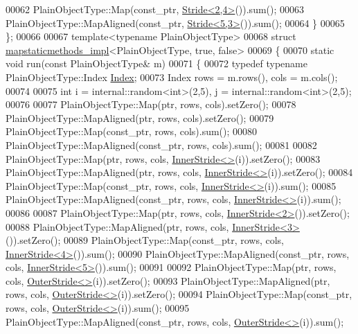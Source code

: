 \begin{DoxyCode}
00062     PlainObjectType::Map(const\_ptr, \hyperlink{group___core___module_class_eigen_1_1_stride}{Stride<2,4>}()).sum();
00063     PlainObjectType::MapAligned(const\_ptr, \hyperlink{group___core___module_class_eigen_1_1_stride}{Stride<5,3>}()).sum();
00064   \}
00065 \};
00066 
00067 \textcolor{keyword}{template}<\textcolor{keyword}{typename} PlainObjectType>
00068 \textcolor{keyword}{struct }\hyperlink{structmapstaticmethods__impl}{mapstaticmethods\_impl}<PlainObjectType, true, false>
00069 \{
00070   \textcolor{keyword}{static} \textcolor{keywordtype}{void} run(\textcolor{keyword}{const} PlainObjectType& m)
00071   \{
00072     \textcolor{keyword}{typedef} \textcolor{keyword}{typename} PlainObjectType::Index \hyperlink{namespace_eigen_a62e77e0933482dafde8fe197d9a2cfde}{Index};
00073     Index rows = m.rows(), cols = m.cols();
00074 
00075     \textcolor{keywordtype}{int} i = internal::random<int>(2,5), j = internal::random<int>(2,5);
00076 
00077     PlainObjectType::Map(ptr, rows, cols).setZero();
00078     PlainObjectType::MapAligned(ptr, rows, cols).setZero();
00079     PlainObjectType::Map(const\_ptr, rows, cols).sum();
00080     PlainObjectType::MapAligned(const\_ptr, rows, cols).sum();
00081 
00082     PlainObjectType::Map(ptr, rows, cols, \hyperlink{class_eigen_1_1_inner_stride}{InnerStride<>}(i)).setZero();
00083     PlainObjectType::MapAligned(ptr, rows, cols, \hyperlink{class_eigen_1_1_inner_stride}{InnerStride<>}(i)).setZero();
00084     PlainObjectType::Map(const\_ptr, rows, cols, \hyperlink{class_eigen_1_1_inner_stride}{InnerStride<>}(i)).sum();
00085     PlainObjectType::MapAligned(const\_ptr, rows, cols, \hyperlink{class_eigen_1_1_inner_stride}{InnerStride<>}(i)).sum();
00086 
00087     PlainObjectType::Map(ptr, rows, cols, \hyperlink{class_eigen_1_1_inner_stride}{InnerStride<2>}()).setZero();
00088     PlainObjectType::MapAligned(ptr, rows, cols, \hyperlink{class_eigen_1_1_inner_stride}{InnerStride<3>}()).setZero();
00089     PlainObjectType::Map(const\_ptr, rows, cols, \hyperlink{class_eigen_1_1_inner_stride}{InnerStride<4>}()).sum();
00090     PlainObjectType::MapAligned(const\_ptr, rows, cols, \hyperlink{class_eigen_1_1_inner_stride}{InnerStride<5>}()).sum();
00091 
00092     PlainObjectType::Map(ptr, rows, cols, \hyperlink{class_eigen_1_1_outer_stride}{OuterStride<>}(i)).setZero();
00093     PlainObjectType::MapAligned(ptr, rows, cols, \hyperlink{class_eigen_1_1_outer_stride}{OuterStride<>}(i)).setZero();
00094     PlainObjectType::Map(const\_ptr, rows, cols, \hyperlink{class_eigen_1_1_outer_stride}{OuterStride<>}(i)).sum();
00095     PlainObjectType::MapAligned(const\_ptr, rows, cols, \hyperlink{class_eigen_1_1_outer_stride}{OuterStride<>}(i)).sum();

\end{DoxyCode}
